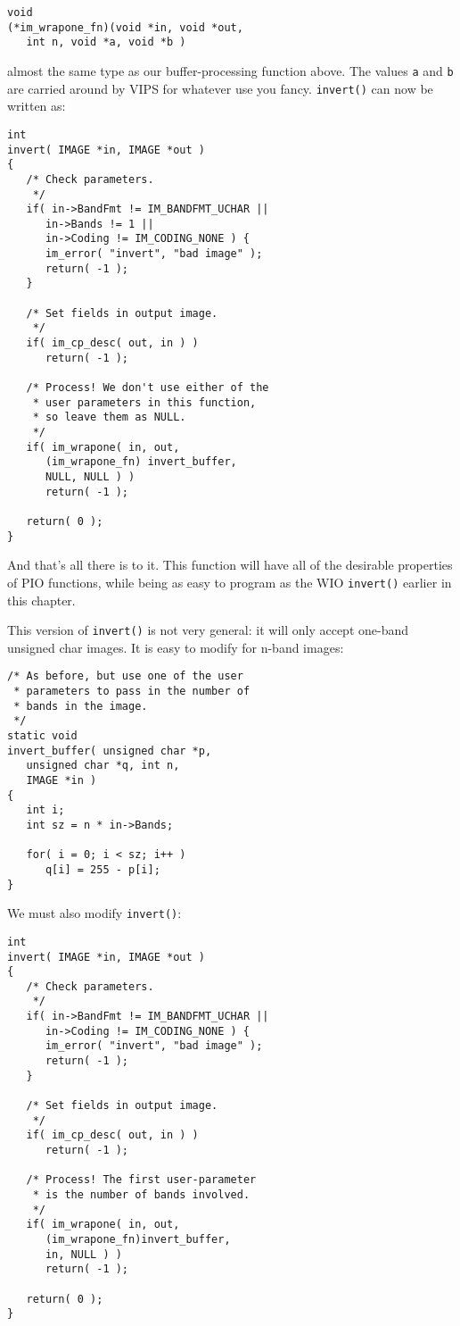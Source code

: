 \begin{verbatim}
void 
(*im_wrapone_fn)(void *in, void *out, 
   int n, void *a, void *b ) 
\end{verbatim}
   
\noindent
almost the same type as our buffer-processing function above. The values
\verb+a+ and \verb+b+ are carried around by VIPS for whatever use you
fancy. \verb+invert()+ can now be written as:

\begin{verbatim}
int
invert( IMAGE *in, IMAGE *out )
{
   /* Check parameters.
    */
   if( in->BandFmt != IM_BANDFMT_UCHAR || 
      in->Bands != 1 || 
      in->Coding != IM_CODING_NONE ) {
      im_error( "invert", "bad image" );
      return( -1 );
   }

   /* Set fields in output image.
    */
   if( im_cp_desc( out, in ) )
      return( -1 );

   /* Process! We don't use either of the 
    * user parameters in this function, 
    * so leave them as NULL.
    */
   if( im_wrapone( in, out,
      (im_wrapone_fn) invert_buffer, 
      NULL, NULL ) )
      return( -1 );

   return( 0 );
} 
\end{verbatim}

And that's all there is to it. This function will have all of the desirable
properties of PIO functions, while being as easy to program as the WIO
\verb+invert()+ earlier in this chapter.

This version of \verb+invert()+ is not very general: it will only accept
one-band unsigned char images. It is easy to modify for n-band images:

\begin{verbatim}
/* As before, but use one of the user 
 * parameters to pass in the number of 
 * bands in the image.
 */
static void
invert_buffer( unsigned char *p, 
   unsigned char *q, int n,
   IMAGE *in )
{
   int i;
   int sz = n * in->Bands;     

   for( i = 0; i < sz; i++ )
      q[i] = 255 - p[i];
}
\end{verbatim}

We must also modify \verb+invert()+:

\begin{verbatim}
int
invert( IMAGE *in, IMAGE *out )
{
   /* Check parameters.
    */
   if( in->BandFmt != IM_BANDFMT_UCHAR || 
      in->Coding != IM_CODING_NONE ) {
      im_error( "invert", "bad image" );
      return( -1 );
   }

   /* Set fields in output image.
    */
   if( im_cp_desc( out, in ) )
      return( -1 );

   /* Process! The first user-parameter 
    * is the number of bands involved.
    */
   if( im_wrapone( in, out,
      (im_wrapone_fn)invert_buffer, 
      in, NULL ) )
      return( -1 );

   return( 0 );
}    
\end{verbatim}

